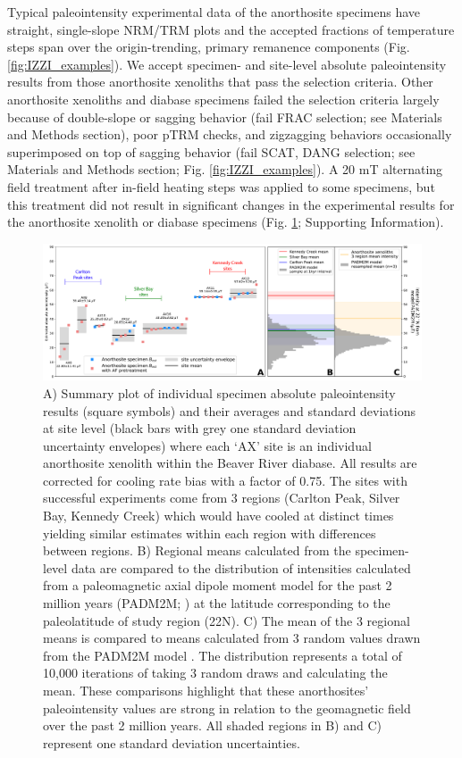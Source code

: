 \documentclass[9pt,twocolumn,twoside,lineno]{pnas-new}
\begin{document}
Typical paleointensity experimental data of the anorthosite specimens have straight, single-slope NRM/TRM plots and the accepted fractions of temperature steps span over the origin-trending, primary remanence components (Fig. \ref{fig:IZZI_examples}). We accept specimen- and site-level absolute paleointensity results from those anorthosite xenoliths that pass the selection criteria. Other anorthosite xenoliths and diabase specimens failed the selection criteria largely because of double-slope or sagging behavior (fail FRAC selection; see Materials and Methods section), poor pTRM checks, and zigzagging behaviors occasionally superimposed on top of sagging behavior (fail SCAT, DANG selection; see Materials and Methods section; Fig. \ref{fig:IZZI_examples}). A 20 mT alternating field treatment after in-field heating steps was applied to some specimens, but this treatment did not result in significant changes in the experimental results for the anorthosite xenolith or diabase specimens (Fig. \ref{fig:PINT_cooling_corrected}; Supporting Information). 

\begin{figure}[h!]
\noindent\includegraphics[width=17.8 cm]{Paleointensity_plot_cooling_corrected.pdf}
\centering
\caption{\footnotesize{A) Summary plot of individual specimen absolute paleointensity results (square symbols) and their averages and standard deviations at site level (black bars with grey one standard deviation uncertainty envelopes) where each `AX' site is an individual anorthosite xenolith within the Beaver River diabase. All results are corrected for cooling rate bias with a factor of 0.75. The sites with successful experiments come from 3 regions (Carlton Peak, Silver Bay, Kennedy Creek) which would have cooled at distinct times yielding similar estimates within each region with differences between regions. B) Regional means calculated from the specimen-level data are compared to the distribution of intensities calculated from a paleomagnetic axial dipole moment model for the past 2 million years (PADM2M; \citealp{Ziegler2011a}) at the latitude corresponding to the paleolatitude of study region (22\textdegree N). C) The mean of the 3 regional means is compared to means calculated from 3 random values drawn from the PADM2M model \cite{Ziegler2011a}. The distribution represents a total of 10,000 iterations of taking 3 random draws and calculating the mean. These comparisons highlight that these anorthosites' paleointensity values are strong in relation to the geomagnetic field over the past 2 million years. All shaded regions in B) and C) represent one standard deviation uncertainties.}}
\label{fig:PINT_cooling_corrected}
\end{figure}
\end{document}

